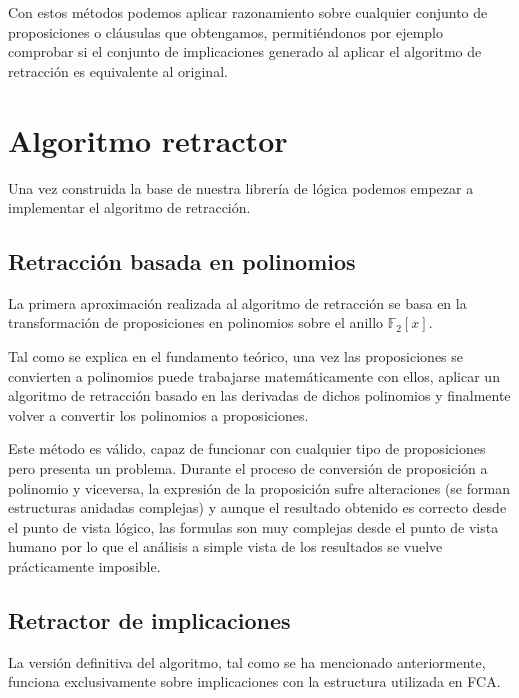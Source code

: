 	Con estos métodos podemos aplicar razonamiento sobre cualquier conjunto de proposiciones o cláusulas que obtengamos, permitiéndonos por ejemplo comprobar si el conjunto de implicaciones generado al aplicar el algoritmo de retracción es equivalente al original.
	
	
\section*{Algoritmo retractor}	
	
	Una vez construida la base de nuestra librería de lógica podemos empezar a implementar el algoritmo de retracción.
	
\subsection*{Retracción basada en polinomios}

	La primera aproximación realizada al algoritmo de retracción se basa en la transformación de proposiciones en polinomios sobre el anillo $\mathbb{F}_2[x]$. 

	Tal como se explica en el fundamento teórico, una vez las proposiciones se convierten a polinomios puede trabajarse matemáticamente con ellos, aplicar un algoritmo de retracción basado en las derivadas de dichos polinomios y finalmente volver a convertir los polinomios a proposiciones.
	
	Este método es válido, capaz de funcionar con cualquier tipo de proposiciones pero presenta un problema. Durante el proceso de conversión de proposición a polinomio y viceversa, la expresión de la proposición sufre alteraciones (se forman estructuras anidadas complejas) y aunque el resultado obtenido es correcto desde el punto de vista lógico, las formulas son muy complejas desde el punto de vista humano por lo que el análisis a simple vista de los resultados se vuelve prácticamente imposible.
	
	
\subsection*{Retractor de implicaciones}
	
	La versión definitiva del algoritmo, tal como se ha mencionado anteriormente, funciona exclusivamente sobre implicaciones con la estructura utilizada en FCA.
	
